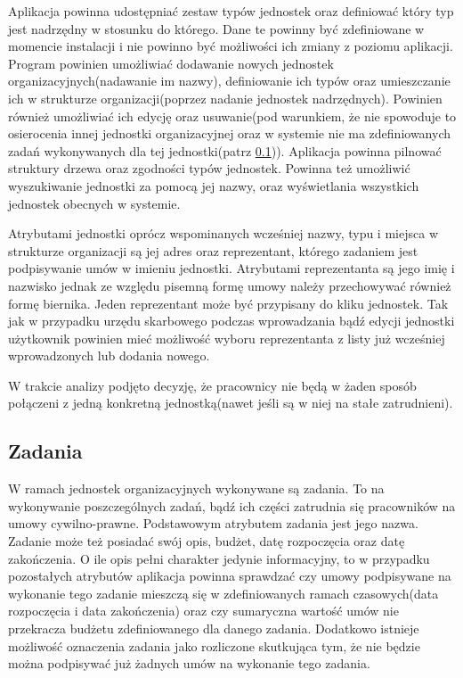 Aplikacja powinna udostępniać zestaw typów jednostek oraz definiować który typ jest nadrzędny w stosunku do którego. Dane te powinny być zdefiniowane w momencie instalacji i nie powinno być możliwości ich zmiany z poziomu aplikacji. Program powinien umożliwiać dodawanie nowych jednostek organizacyjnych(nadawanie im nazwy), definiowanie ich typów oraz umieszczanie ich w strukturze organizacji(poprzez nadanie jednostek nadrzędnych). Powinien również umożliwiać ich edycję oraz usuwanie(pod warunkiem, że nie spowoduje to osierocenia innej jednostki organizacyjnej oraz w systemie nie ma zdefiniowanych zadań wykonywanych dla tej jednostki(patrz \ref{zadania})). Aplikacja powinna pilnować struktury drzewa oraz zgodności typów jednostek. Powinna też umożliwić wyszukiwanie jednostki za pomocą jej nazwy, oraz wyświetlania wszystkich jednostek obecnych w systemie.

Atrybutami jednostki oprócz wspominanych wcześniej nazwy, typu i miejsca w strukturze organizacji są jej adres oraz reprezentant, którego zadaniem jest podpisywanie umów w imieniu jednostki. Atrybutami reprezentanta są jego imię i nazwisko jednak ze względu pisemną formę umowy należy przechowywać również formę biernika. Jeden reprezentant może być przypisany do kliku jednostek. Tak jak w przypadku urzędu skarbowego podczas wprowadzania bądź edycji jednostki użytkownik powinien mieć możliwość wyboru reprezentanta z listy już wcześniej wprowadzonych lub dodania nowego.

W trakcie analizy podjęto decyzję, że pracownicy nie będą w żaden sposób połączeni z jedną konkretną jednostką(nawet jeśli są w niej na stałe zatrudnieni).

\subsection[Zadania][Zadania]{Zadania}
\label{zadania}
W ramach jednostek organizacyjnych wykonywane są zadania. To na wykonywanie poszczególnych zadań, bądź ich części zatrudnia się pracowników na umowy cywilno-prawne. Podstawowym atrybutem zadania jest jego nazwa. Zadanie może też posiadać swój opis, budżet, datę rozpoczęcia oraz datę zakończenia. O ile opis pełni charakter jedynie informacyjny, to w przypadku pozostałych atrybutów aplikacja powinna sprawdzać czy umowy podpisywane na wykonanie tego zadanie mieszczą się w zdefiniowanych ramach czasowych(data rozpoczęcia i data zakończenia) oraz czy sumaryczna wartość umów nie przekracza budżetu zdefiniowanego dla danego zadania. Dodatkowo istnieje możliwość oznaczenia zadania jako rozliczone skutkująca tym, że nie będzie można podpisywać już żadnych umów na wykonanie tego zadania. 

